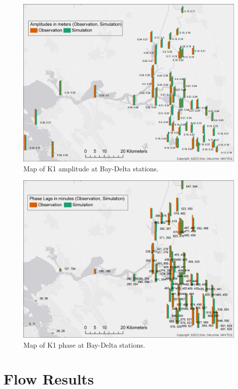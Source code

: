 \begin{figure}
	\centering
		\includegraphics[width=\textwidth]{image/K1_amp_spatial}
	\caption{Map of K1 amplitude at Bay-Delta stations.}
	\label{fig:k1_amp}
\end{figure}
\begin{figure}
	\centering
		\includegraphics[width=\textwidth]{image/K1_phase_min_spatial}
	\caption{Map of K1 phase at Bay-Delta stations.}
	\label{fig:k1_phase}
\end{figure}

		
		
\section{Flow Results}
